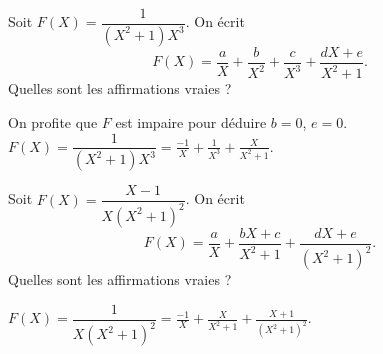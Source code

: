 \begin{question}
Soit $F(X) = \dfrac{1}{(X^2+1)X^3}$.
On écrit 
$$F(X) = \frac{a}{X} + \frac{b}{X^2} +  \frac{c}{X^3}
+ \frac{dX+e}{X^2+1}.$$
Quelles sont les affirmations vraies ?
\begin{answers}



\end{answers}
\begin{explanations}
On profite que $F$ est impaire pour déduire $b=0$, $e=0$.
$F(X) = \dfrac{1}{(X^2+1)X^3} = \frac{-1}{X}  +  \frac{1}{X^3}
+ \frac{X}{X^2+1}.$
\end{explanations}
\end{question}


\begin{question}
Soit $F(X) = \dfrac{X-1}{X(X^2+1)^2}$.
On écrit 
$$F(X) = \frac{a}{X} + \frac{bX+c}{X^2+1} +  \frac{dX+e}{(X^2+1)^2}.$$
Quelles sont les affirmations vraies ?
\begin{answers}



    
\end{answers}
\begin{explanations}
$F(X) = \dfrac{1}{X(X^2+1)^2} = \frac{-1}{X} + \frac{X}{X^2+1} +  \frac{X+1}{(X^2+1)^2}.$
\end{explanations}
\end{question}

